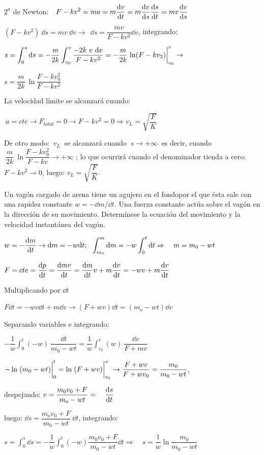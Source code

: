 $2^a$ de Newton: $\displaystyle \ \ F-kv^2=ma=m \dv{v}{t}=m\dv{v}{s} \dv{s}{t}=mv\dv{v}{s}$

$(F-kv^2)\ \dd s= mv\ \dd v \to \ \ \dd s=\dfrac{mv}{F-kv^2}\dd v$, integrando:

$s=\displaystyle \int_0^s \dd s= -\dfrac m{2k} \int_{v_0}^v \dfrac{-2k\ v\ \dd v}{F-kv^2} =-\dfrac m{2k} \eval{\ln (F-kv_2)}_{v_0}^v  \to$

$\displaystyle s=\dfrac m{2k} \ \ln \dfrac{F-kv_0^2}{F-kv^2}$

La velocidad límite se alcanzará cuando: 

$\ a=cte \to F_{total}=0 \to F-kv^2=0 \Rightarrow v_L=\sqrt{\dfrac{F}{K}}$

\textcolor{gris}{De otro modo: $\ v_L \ $ se alcanzará cuando $\ s\to +\infty \ $ es decir, cuando  $\ \dfrac m{2k} \ \ln \dfrac{F-kv_0^2}{F-kv} \to + \infty$ ; lo que ocurrirá cuando el denominador tienda a cero: $F-kv^2 \to 0$, luego: $v_L=\sqrt{\dfrac{F}{K}}$}.

\begin{prob}
Un vagón cargado de arena tiene un agujero en el fondopor el que ésta sale con una rapidez constante $w=-\dd m / \dd t$. Una fuerza constante actúa sobre el vagón en la dirección de su movimiento. Determínese la ecuación del movimiento y la velocidad instantánea del vagón.	
\end{prob}

$\displaystyle w=-\dv{m}{t} \to \dd m = -w \dd t ;\ \ \int_{m_0}^m \dd m=-w \int_0^t \dd t \Rightarrow \quad m=m_0-wt$

$\displaystyle F=cte=\dv{p}{t}=\dv{mv}{t}=\dv{m}{t}v+m\dv{v}{t}=-wv+m\dv{v}{t}$

Multiplicando por $\dd t$ 

$\displaystyle F\dd t=-wv\dd t + m \dd v \to (F+wv)\dd t=(m_o-wt)\dd v$

Separando variables e integrando: 

$\displaystyle - \dfrac 1 w \int_0^t (-w)\ \dfrac{\dd t}{m_0-wt}=\dfrac 1 w \int_{v_0}^v (w) \ \dfrac{\dd v}{F+mv}$

$\displaystyle -\ln \eval{(m_0-wt)}_0^t=\ln \eval{(F+wv)}_{v_0}^v \to
\dfrac{F+wv}{F+wv_0}=\dfrac{m_0}{m_0-wt}$, 

despejando:
$\displaystyle v=\dfrac{m_0v_0+F}{m_o-wt}=\quad \dv{s}{t}$

luego: $\displaystyle \dd s= \dfrac{m_ov_0+F}{m_0-wt} \ \dd t$, integrando:

$\displaystyle s=\int_0^s \dd s= -\dfrac 1 w \int_0^t (-w) \dfrac{m_0v_0+F}{m_0-wt} \dd t \Rightarrow \quad s=\dfrac 1 w \ln \dfrac {m_0}{m_0-wt}$

